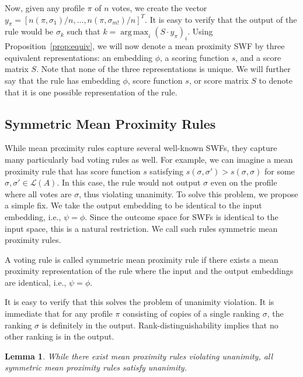 \documentclass[10pt,letterpaper]{article}
\newcommand{\calL}{{\mathcal{L}}}
\newcommand{\rank}{{\calL(A)}}
\DeclareMathOperator*{\argmax}{arg\,max}
\newtheorem{lemma}{Lemma}
\newenvironment{definition}[1][Definition]{\begin{trivlist}
\item[\hskip \labelsep {\bfseries #1}]}{\end{trivlist}}
\begin{document}
Now, given any profile $\pi$ of $n$ votes, we create the vector $y_{\pi} = [n(\pi,\sigma_1)/n,\ldots,n(\pi,\sigma_{m!})/n]^T$. It is easy to verify that the output of the rule would be $\sigma_k$ such that $k = \argmax_i (S\cdot y_{\pi})_i$. Using Proposition~\ref{prop:equiv}, we will now denote a mean proximity SWF by three equivalent representations: an embedding $\phi$, a scoring function $s$, and a score matrix $S$. Note that none of the three representations is unique. We will further say that the rule has embedding $\phi$, score function $s$, or score matrix $S$ to denote that it is one possible representation of the rule.


\subsection{Symmetric Mean Proximity Rules}

While mean proximity rules capture several well-known SWFs, they capture many particularly bad voting rules as well. For example, we can imagine a mean proximity rule that has score function $s$ satisfying $s(\sigma,\sigma') > s(\sigma,\sigma)$ for some $\sigma,\sigma' \in \rank$. In this case, the rule would not output $\sigma$ even on the profile where all votes are $\sigma$, thus violating unanimity. To solve this problem, we propose a simple fix. We take the output embedding to be identical to the input embedding, i.e., $\psi = \phi$. Since the outcome space for SWFs is identical to the input space, this is a natural restriction. We call such rules symmetric mean proximity rules.

\begin{definition}[Symmetric Mean Proximity Rules]
A voting rule is called symmetric mean proximity rule if there exists a mean proximity representation of the rule where the input and the output embeddings are identical, i.e., $\psi = \phi$. 
\end{definition} 

It is easy to verify that this solves the problem of unanimity violation. It is immediate that for any profile $\pi$ consisting of copies of a single ranking $\sigma$, the ranking $\sigma$ is definitely in the output. Rank-distinguishability implies that no other ranking is in the output.


\begin{lemma}
While there exist mean proximity rules violating unanimity, all symmetric mean proximity rules satisfy unanimity.
\end{lemma}
\end{document}

